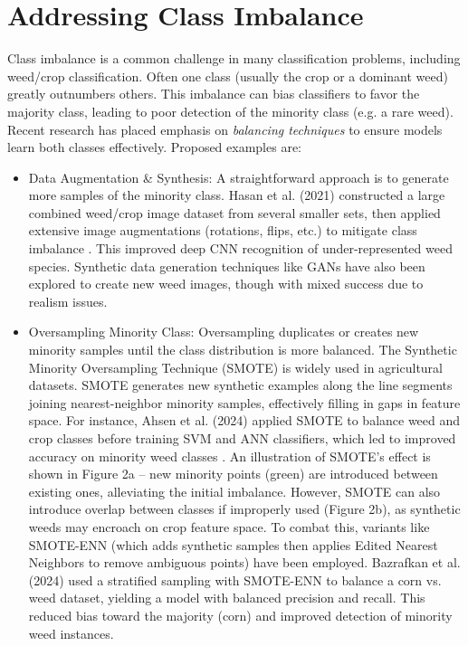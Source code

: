 \documentclass[letterpaper, notitlepage]{report}
\begin{document}
\section{Addressing Class Imbalance}  
Class imbalance is a common challenge in many classification problems, including weed/crop classification. Often one class (usually the crop or a dominant weed) greatly outnumbers others. This imbalance can bias classifiers to favor the majority class, leading to poor detection of the minority class (e.g. a rare weed). Recent research \parencite{Wang2021-dh} has placed emphasis on \textit{balancing techniques} to ensure models learn both classes effectively. Proposed examples are:  

\begin{itemize}
	\item{Data Augmentation \& Synthesis: A straightforward approach is to generate more samples of the minority class. Hasan et al. (2021) constructed a large combined weed/crop image dataset from several smaller sets, then applied extensive image augmentations (rotations, flips, etc.) to mitigate class imbalance \parencite{Mahmudul-Hasan2023-ap}. This improved deep CNN recognition of under-represented weed species. Synthetic data generation techniques like GANs have also been explored to create new weed images, though with mixed success due to realism issues. } 

	\item{Oversampling Minority Class: Oversampling duplicates or creates new minority samples until the class distribution is more balanced. The Synthetic Minority Oversampling Technique (SMOTE) is widely used  in agricultural datasets. SMOTE generates new synthetic examples along the line segments joining nearest-neighbor minority samples, effectively filling in gaps in feature space. For instance, Ahsen et al. (2024) applied SMOTE to balance weed and crop classes before training SVM and ANN classifiers, which led to improved accuracy on minority weed classes \parencite{Ahsen2024-tr}. An illustration of SMOTE’s effect is shown in Figure 2a – new minority points (green) are introduced between existing ones, alleviating the initial imbalance. However, SMOTE can also introduce overlap between classes if improperly used (Figure 2b), as synthetic weeds may encroach on crop feature space. To combat this, variants like SMOTE-ENN (which adds synthetic samples then applies Edited Nearest Neighbors to remove ambiguous points) have been employed. Bazrafkan et al. (2024) used a stratified sampling with SMOTE-ENN to balance a corn vs. weed  dataset, yielding a model with balanced precision and recall. This reduced bias toward the majority (corn) and improved detection of minority weed instances.}


\end{itemize}
\end{document}
